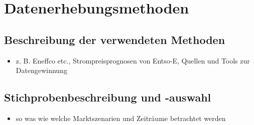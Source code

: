\section{Datenerhebungsmethoden}
\label{ch_05Datenerhebungsmethoden}


\subsection{Beschreibung der verwendeten Methoden}
\label{ch_05Beschreibung der verwendeten Methoden}
\begin{itemize}
	\item z. B. Eneffco etc., Strompreisprognosen von Entso-E, Quellen und Tools zur Datengewinnung
\end{itemize}

\subsection{Stichprobenbeschreibung und -auswahl}
\label{ch_05Stichprobenbeschreibung und -auswahl}
\begin{itemize}
	\item so was wie welche Marktszenarien und Zeiträume betrachtet werden
\end{itemize}